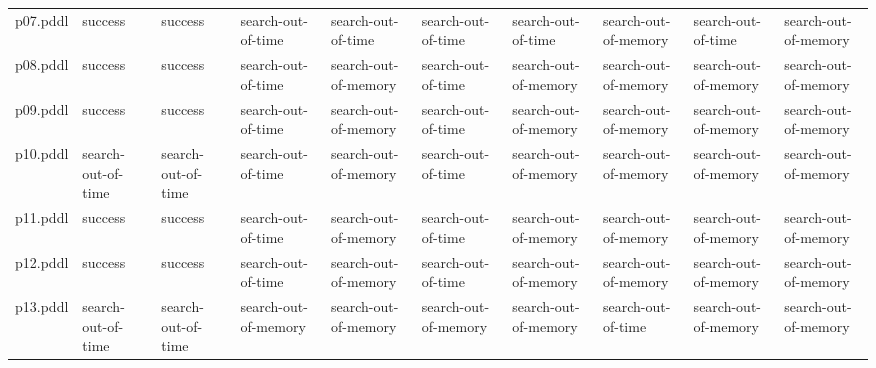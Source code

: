 \documentclass{article}
\begin{document}
\begin{tabular}{@{}lrrrrrrrrr@{}}
p07.pddl & \multicolumn{1}{|l|}{success} & \multicolumn{1}{|l|}{success} & \multicolumn{1}{|l|}{search-out-of-time} & \multicolumn{1}{|l|}{search-out-of-time} & \multicolumn{1}{|l|}{search-out-of-time} & \multicolumn{1}{|l|}{search-out-of-time} & \multicolumn{1}{|l|}{search-out-of-memory} & \multicolumn{1}{|l|}{search-out-of-time} & \multicolumn{1}{|l|}{search-out-of-memory} \\
p08.pddl & \multicolumn{1}{|l|}{success} & \multicolumn{1}{|l|}{success} & \multicolumn{1}{|l|}{search-out-of-time} & \multicolumn{1}{|l|}{search-out-of-memory} & \multicolumn{1}{|l|}{search-out-of-time} & \multicolumn{1}{|l|}{search-out-of-memory} & \multicolumn{1}{|l|}{search-out-of-memory} & \multicolumn{1}{|l|}{search-out-of-memory} & \multicolumn{1}{|l|}{search-out-of-memory} \\
p09.pddl & \multicolumn{1}{|l|}{success} & \multicolumn{1}{|l|}{success} & \multicolumn{1}{|l|}{search-out-of-time} & \multicolumn{1}{|l|}{search-out-of-memory} & \multicolumn{1}{|l|}{search-out-of-time} & \multicolumn{1}{|l|}{search-out-of-memory} & \multicolumn{1}{|l|}{search-out-of-memory} & \multicolumn{1}{|l|}{search-out-of-memory} & \multicolumn{1}{|l|}{search-out-of-memory} \\
p10.pddl & \multicolumn{1}{|l|}{search-out-of-time} & \multicolumn{1}{|l|}{search-out-of-time} & \multicolumn{1}{|l|}{search-out-of-time} & \multicolumn{1}{|l|}{search-out-of-memory} & \multicolumn{1}{|l|}{search-out-of-time} & \multicolumn{1}{|l|}{search-out-of-memory} & \multicolumn{1}{|l|}{search-out-of-memory} & \multicolumn{1}{|l|}{search-out-of-memory} & \multicolumn{1}{|l|}{search-out-of-memory} \\
p11.pddl & \multicolumn{1}{|l|}{success} & \multicolumn{1}{|l|}{success} & \multicolumn{1}{|l|}{search-out-of-time} & \multicolumn{1}{|l|}{search-out-of-memory} & \multicolumn{1}{|l|}{search-out-of-time} & \multicolumn{1}{|l|}{search-out-of-memory} & \multicolumn{1}{|l|}{search-out-of-memory} & \multicolumn{1}{|l|}{search-out-of-memory} & \multicolumn{1}{|l|}{search-out-of-memory} \\
p12.pddl & \multicolumn{1}{|l|}{success} & \multicolumn{1}{|l|}{success} & \multicolumn{1}{|l|}{search-out-of-time} & \multicolumn{1}{|l|}{search-out-of-memory} & \multicolumn{1}{|l|}{search-out-of-time} & \multicolumn{1}{|l|}{search-out-of-memory} & \multicolumn{1}{|l|}{search-out-of-memory} & \multicolumn{1}{|l|}{search-out-of-memory} & \multicolumn{1}{|l|}{search-out-of-memory} \\
p13.pddl & \multicolumn{1}{|l|}{search-out-of-time} & \multicolumn{1}{|l|}{search-out-of-time} & \multicolumn{1}{|l|}{search-out-of-memory} & \multicolumn{1}{|l|}{search-out-of-memory} & \multicolumn{1}{|l|}{search-out-of-memory} & \multicolumn{1}{|l|}{search-out-of-memory} & \multicolumn{1}{|l|}{search-out-of-time} & \multicolumn{1}{|l|}{search-out-of-memory} & \multicolumn{1}{|l|}{search-out-of-memory} \\

\end{tabular}
\end{document}

